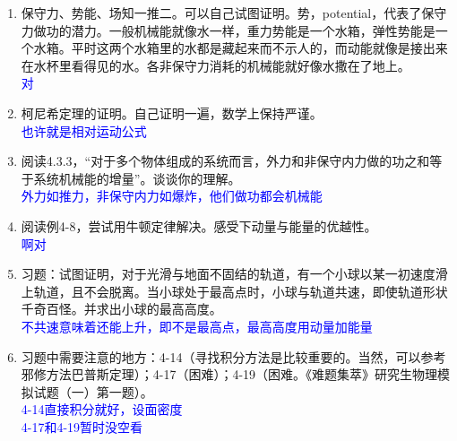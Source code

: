 \documentclass[12pt,a4paper]{article}
\begin{document}
\begin{enumerate}[label=\arabic*.,leftmargin=*]
    \item 保守力、势能、场知一推二。可以自己试图证明。势，potential，代表了保守力做功的潜力。一般机械能就像水一样，重力势能是一个水箱，弹性势能是一个水箱。平时这两个水箱里的水都是藏起来而不示人的，而动能就像是接出来在水杯里看得见的水。各非保守力消耗的机械能就好像水撒在了地上。
\textcolor{blue}{\\对}
    \item 柯尼希定理的证明。自己证明一遍，数学上保持严谨。
\textcolor{blue}{\\也许就是相对运动公式}
    \item 阅读4.3.3，“对于多个物体组成的系统而言，外力和非保守内力做的功之和等于系统机械能的增量”。谈谈你的理解。
\textcolor{blue}{\\外力如推力，非保守内力如爆炸，他们做功都会机械能}
    \item 阅读例4-8，尝试用牛顿定律解决。感受下动量与能量的优越性。
\textcolor{blue}{\\啊对}
    \item 习题：试图证明，对于光滑与地面不固结的轨道，有一个小球以某一初速度滑上轨道，且不会脱离。当小球处于最高点时，小球与轨道共速，即使轨道形状千奇百怪。并求出小球的最高高度。
\textcolor{blue}{\\不共速意味着还能上升，即不是最高点，最高高度用动量加能量}
    \item 习题中需要注意的地方：4-14（寻找积分方法是比较重要的。当然，可以参考邪修方法巴普斯定理）；4-17（困难）；4-19（困难。《难题集萃》研究生物理模拟试题（一）第一题）。
\textcolor{blue}{\\4-14直接积分就好，设面密度
\\4-17和4-19暂时没空看}
\end{enumerate}
\end{document}
